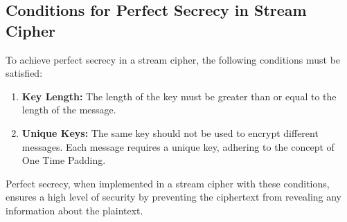 \documentclass[11pt]{article}
\begin{document}
\subsection*{Conditions for Perfect Secrecy in Stream Cipher}

To achieve perfect secrecy in a stream cipher, the following conditions must be satisfied:
\begin{enumerate}
    \item \textbf{Key Length:} The length of the key must be greater than or equal to the length of the message.
    \item \textbf{Unique Keys:} The same key should not be used to encrypt different messages. Each message requires a unique key, adhering to the concept of One Time Padding.
\end{enumerate}

Perfect secrecy, when implemented in a stream cipher with these conditions, ensures a high level of security by preventing the ciphertext from revealing any information about the plaintext.
\end{document}
